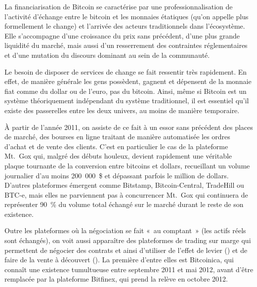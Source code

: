 La financiarisation de Bitcoin se caractérise par une professionnalisation de l'activité d'échange entre le bitcoin et les monnaies étatiques (qu'on appelle plus formellement le change) et l'arrivée des acteurs traditionnels dans l'écosystème. Elle s'accompagne d'une croissance du prix sans précédent, d'une plus grande liquidité du marché, mais aussi d'un resserrement des contraintes réglementaires et d'une mutation du discours dominant au sein de la communauté.


Le besoin de disposer de services de change se fait ressentir très rapidement. En effet, de manière générale les gens possèdent, gagnent et dépensent de la monnaie fiat comme du dollar ou de l'euro, pas du bitcoin. Ainsi, même si Bitcoin est un système théoriquement indépendant du système traditionnel, il est essentiel qu'il existe des passerelles entre les deux univers, au moins de manière temporaire.

À partir de l'année 2011, on assiste de ce fait à un essor sans précédent des places de marché, des bourses en ligne traitant de manière automatisée les ordres d'achat et de vente des clients. C'est en particulier le cas de la plateforme Mt.~Gox qui, malgré des débuts houleux, devient rapidement une véritable plaque tournante de la conversion entre bitcoins et dollars, recueillant un volume journalier d'au moins 200~000~\$ et dépassant parfois le million de dollars. D'autres plateformes émergent comme Bitstamp, Bitcoin-Central, TradeHill ou BTC-e, mais elles ne parviennent pas à concurrencer Mt.~Gox qui continuera de représenter 90~\% du volume total échangé sur le marché durant le reste de son existence.

Outre les plateformes où la négociation se fait «~au comptant~» (les actifs réels sont échangés), on voit aussi apparaître des plateformes de trading sur marge qui permettent de négocier des contrats et ainsi d'utiliser de l'effet de levier () et de faire de la vente à découvert (). La première d'entre elles est Bitcoinica, qui connaît une existence tumultueuse entre septembre 2011 et mai 2012, avant d'être remplacée par la plateforme Bitfinex, qui prend la relève en octobre 2012.

